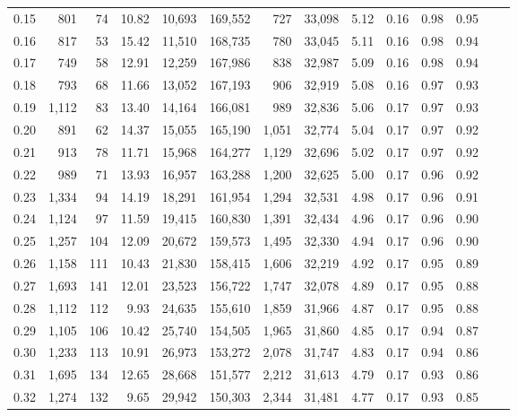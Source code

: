 \begin{tabular}{rrrrrrrrrrrrrr}
0.15 &    801 &   74 &   10.82 &   10,693 &  169,552 &     727 &  33,098 &  5.12 &  0.16 &  0.98 &      0.95 \\
0.16 &    817 &   53 &   15.42 &   11,510 &  168,735 &     780 &  33,045 &  5.11 &  0.16 &  0.98 &      0.94 \\
0.17 &    749 &   58 &   12.91 &   12,259 &  167,986 &     838 &  32,987 &  5.09 &  0.16 &  0.98 &      0.94 \\
0.18 &    793 &   68 &   11.66 &   13,052 &  167,193 &     906 &  32,919 &  5.08 &  0.16 &  0.97 &      0.93 \\
0.19 &  1,112 &   83 &   13.40 &   14,164 &  166,081 &     989 &  32,836 &  5.06 &  0.17 &  0.97 &      0.93 \\
0.20 &    891 &   62 &   14.37 &   15,055 &  165,190 &   1,051 &  32,774 &  5.04 &  0.17 &  0.97 &      0.92 \\
0.21 &    913 &   78 &   11.71 &   15,968 &  164,277 &   1,129 &  32,696 &  5.02 &  0.17 &  0.97 &      0.92 \\
0.22 &    989 &   71 &   13.93 &   16,957 &  163,288 &   1,200 &  32,625 &  5.00 &  0.17 &  0.96 &      0.92 \\
0.23 &  1,334 &   94 &   14.19 &   18,291 &  161,954 &   1,294 &  32,531 &  4.98 &  0.17 &  0.96 &      0.91 \\
0.24 &  1,124 &   97 &   11.59 &   19,415 &  160,830 &   1,391 &  32,434 &  4.96 &  0.17 &  0.96 &      0.90 \\
0.25 &  1,257 &  104 &   12.09 &   20,672 &  159,573 &   1,495 &  32,330 &  4.94 &  0.17 &  0.96 &      0.90 \\
0.26 &  1,158 &  111 &   10.43 &   21,830 &  158,415 &   1,606 &  32,219 &  4.92 &  0.17 &  0.95 &      0.89 \\
0.27 &  1,693 &  141 &   12.01 &   23,523 &  156,722 &   1,747 &  32,078 &  4.89 &  0.17 &  0.95 &      0.88 \\
0.28 &  1,112 &  112 &    9.93 &   24,635 &  155,610 &   1,859 &  31,966 &  4.87 &  0.17 &  0.95 &      0.88 \\
0.29 &  1,105 &  106 &   10.42 &   25,740 &  154,505 &   1,965 &  31,860 &  4.85 &  0.17 &  0.94 &      0.87 \\
0.30 &  1,233 &  113 &   10.91 &   26,973 &  153,272 &   2,078 &  31,747 &  4.83 &  0.17 &  0.94 &      0.86 \\
0.31 &  1,695 &  134 &   12.65 &   28,668 &  151,577 &   2,212 &  31,613 &  4.79 &  0.17 &  0.93 &      0.86 \\
0.32 &  1,274 &  132 &    9.65 &   29,942 &  150,303 &   2,344 &  31,481 &  4.77 &  0.17 &  0.93 &      0.85 \\

\end{tabular}
